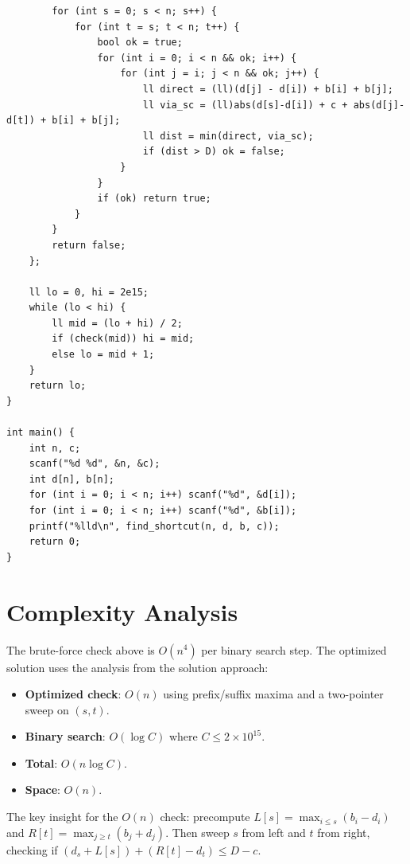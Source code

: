 \documentclass[11pt,a4paper]{article}
\begin{document}
\begin{lstlisting}
        for (int s = 0; s < n; s++) {
            for (int t = s; t < n; t++) {
                bool ok = true;
                for (int i = 0; i < n && ok; i++) {
                    for (int j = i; j < n && ok; j++) {
                        ll direct = (ll)(d[j] - d[i]) + b[i] + b[j];
                        ll via_sc = (ll)abs(d[s]-d[i]) + c + abs(d[j]-d[t]) + b[i] + b[j];
                        ll dist = min(direct, via_sc);
                        if (dist > D) ok = false;
                    }
                }
                if (ok) return true;
            }
        }
        return false;
    };

    ll lo = 0, hi = 2e15;
    while (lo < hi) {
        ll mid = (lo + hi) / 2;
        if (check(mid)) hi = mid;
        else lo = mid + 1;
    }
    return lo;
}

int main() {
    int n, c;
    scanf("%d %d", &n, &c);
    int d[n], b[n];
    for (int i = 0; i < n; i++) scanf("%d", &d[i]);
    for (int i = 0; i < n; i++) scanf("%d", &b[i]);
    printf("%lld\n", find_shortcut(n, d, b, c));
    return 0;
}
\end{lstlisting}

\section{Complexity Analysis}

The brute-force check above is $O(n^4)$ per binary search step. The optimized solution uses the analysis from the solution approach:

\begin{itemize}
  \item \textbf{Optimized check}: $O(n)$ using prefix/suffix maxima and a two-pointer sweep on $(s, t)$.
  \item \textbf{Binary search}: $O(\log C)$ where $C \le 2 \times 10^{15}$.
  \item \textbf{Total}: $O(n \log C)$.
  \item \textbf{Space}: $O(n)$.
\end{itemize}

The key insight for the $O(n)$ check: precompute $L[s] = \max_{i \le s}(b_i - d_i)$ and $R[t] = \max_{j \ge t}(b_j + d_j)$. Then sweep $s$ from left and $t$ from right, checking if $(d_s + L[s]) + (R[t] - d_t) \le D - c$.
\end{document}
